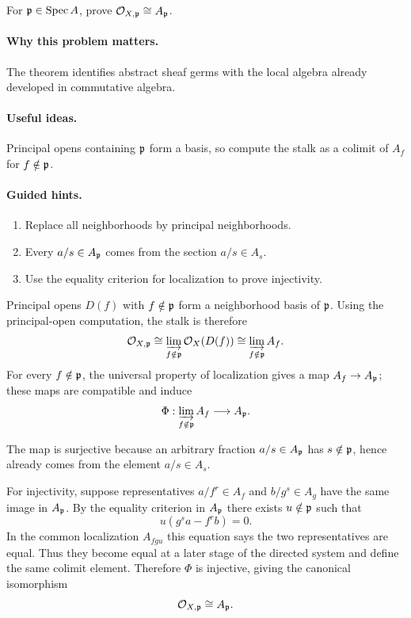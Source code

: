 \begin{problem}\label{prob:vi17-p03}
For $\mathfrak p\in\operatorname{Spec} A$, prove $\mathcal O_{X,\mathfrak p}\cong A_{\mathfrak p}$.
\end{problem}

\ifdefined\FullProblemDossiers
\paragraph{Why this problem matters.}
The theorem identifies abstract sheaf germs with the local algebra already developed in commutative algebra.

\paragraph{Useful ideas.}
Principal opens containing $\mathfrak p$ form a basis, so compute the stalk as a colimit of $A_f$ for $f\notin\mathfrak p$.

\paragraph{Guided hints.}
\begin{enumerate}
\item Replace all neighborhoods by principal neighborhoods.
\item Every $a/s\in A_{\mathfrak p}$ comes from the section $a/s\in A_s$.
\item Use the equality criterion for localization to prove injectivity.
\end{enumerate}

\begin{solution}
Principal opens $D(f)$ with $f\notin\mathfrak p$ form a neighborhood basis of $\mathfrak p$.  Using the principal-open computation, the stalk is therefore
\[
\mathcal O_{X,\mathfrak p}
\cong
\varinjlim_{f\notin\mathfrak p}\mathcal O_X(D(f))
\cong
\varinjlim_{f\notin\mathfrak p}A_f.
\]
For every $f\notin\mathfrak p$, the universal property of localization gives a map $A_f\to A_{\mathfrak p}$; these maps are compatible and induce
\[
\Phi:\varinjlim_{f\notin\mathfrak p}A_f\longrightarrow A_{\mathfrak p}.
\]

The map is surjective because an arbitrary fraction $a/s\in A_{\mathfrak p}$ has $s\notin\mathfrak p$, hence already comes from the element $a/s\in A_s$.

For injectivity, suppose representatives $a/f^r\in A_f$ and $b/g^s\in A_g$ have the same image in $A_{\mathfrak p}$.  By the equality criterion in $A_{\mathfrak p}$ there exists $u\notin\mathfrak p$ such that
\[
u(g^sa-f^rb)=0.
\]
In the common localization $A_{fgu}$ this equation says the two representatives are equal.  Thus they become equal at a later stage of the directed system and define the same colimit element.  Therefore $\Phi$ is injective, giving the canonical isomorphism
\[
\mathcal O_{X,\mathfrak p}\cong A_{\mathfrak p}.
\]
\end{solution}



